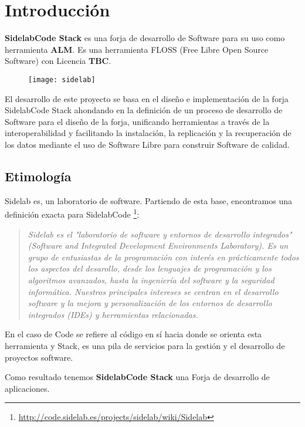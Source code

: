\section{Introducción}
\label{sec:introducción}

\par \textbf{SidelabCode Stack} es una forja de desarrollo de Software para su uso como herramienta \textbf{ALM}. Es una herramienta FLOSS (Free Libre Open Source Software) con Licencia \textbf{TBC}.

\begin{figure}[h]
    \begin{center}	
        \texttt{[image: sidelab]}
        \label{fig:sidelab}
    \end{center}
\end{figure}

\par El desarrollo de este proyecto se basa en el diseño e implementación de la forja SidelabCode Stack ahondando en la definición de un proceso de desarrollo de Software para el diseño de la forja, unificando herramientas a través de la interoperabilidad y facilitando la instalación, la replicación y la recuperación de los datos mediante el uso de Software Libre para construir Software de calidad.

\subsection{Etimología}
\label{sub:etimologia}

\par Sidelab es, un laboratorio de software. Partiendo de esta base, encontramos una definición exacta para SidelabCode \footnote{\url{http://code.sidelab.es/projects/sidelab/wiki/Sidelab}}:

\begin{quotation}
        \emph{Sidelab es el "laboratorio de software y entornos de desarrollo integrados" (Software and Integrated Development Environments Laboratory). Es un grupo de entusiastas de la programación con interés en prácticamente todos los aspectos del desarollo, desde los lenguajes de programación y los algoritmos avanzados, hasta la ingeniería del software y la seguridad informática. Nuestros principales intereses se centran en el desarrollo software y la mejora y personalización de los entornos de desarrollo integrados (IDEs) y herramientas relacionadas.}
\end{quotation}

\par En el caso de Code se refiere al código en sí hacia donde se orienta esta herramienta y Stack, es una pila de servicios para la gestión y el desarrollo de proyectos software.

\par Como resultado tenemos \textbf{SidelabCode Stack} una Forja de desarrollo de aplicaciones.

